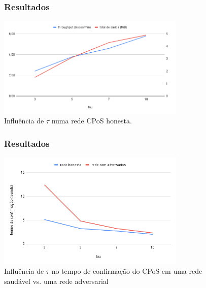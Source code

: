 \documentclass{beamer}
\begin{document}
\begin{frame}
\begin{figure}
\frametitle{Resultados}
    \centering
    \includegraphics[width=0.8\textwidth]{images/test_honest_throughput_data.png}
    \caption{Influência de $\tau$ numa rede CPoS honesta.}
\end{figure}
\end{frame}
    
%

\begin{frame}
\begin{figure}
\frametitle{Resultados}
    \centering
    \includegraphics[width=0.8\textwidth]{images/test_adversarial.png}
    \caption{Influência de $\tau$ no tempo de confirmação do CPoS em uma rede saudável vs. uma rede adversarial}
\end{figure}
\end{frame}
\end{document}
